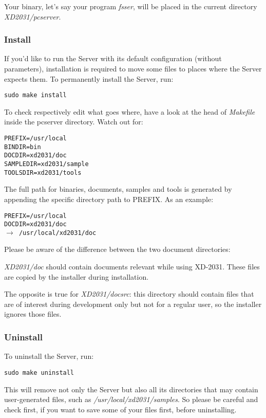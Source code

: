 Your binary, let's say your program \textit{fsser},  will be placed 
in the current directory \textit{XD2031/pcserver}.

\subsubsection{Install}
If you'd like to run the Server with its default configuration
(without parameters), installation is required to move
some files to places where the Server expects them. To permanently install
the Server, run:

\begin{verbatim}
sudo make install
\end{verbatim}

To check respectively edit what goes where, have a look at the head of \textit{Makefile}
inside the pcserver directory. Watch out for:

\begin{verbatim}
PREFIX=/usr/local
BINDIR=bin
DOCDIR=xd2031/doc
SAMPLEDIR=xd2031/sample
TOOLSDIR=xd2031/tools
\end{verbatim}

The full path for binaries, documents, samples and tools is generated by
appending the specific directory path to PREFIX. As an example:

\texttt{PREFIX=/usr/local \\
DOCDIR=xd2031/doc \\
$\to$ /usr/local/xd2031/doc}

Please be aware of the difference between the two document directories:

\textit{XD2031/doc} should contain documents relevant while
using XD-2031. These files are copied by the installer during installation.

The opposite is true for \textit{XD2031/docsrc}: this directory should
contain files that are of interest during development only but not
for a regular user, so the installer ignores those files.

\subsubsection{Uninstall}
To uninstall the Server, run:

\begin{verbatim}
sudo make uninstall
\end{verbatim}

This will remove not only the Server but also all its directories that may
contain user-generated files, such as \textit{/usr/local/xd2031/samples}.
So please be careful and check first, if you want to save some of your
files first, before uninstalling.

